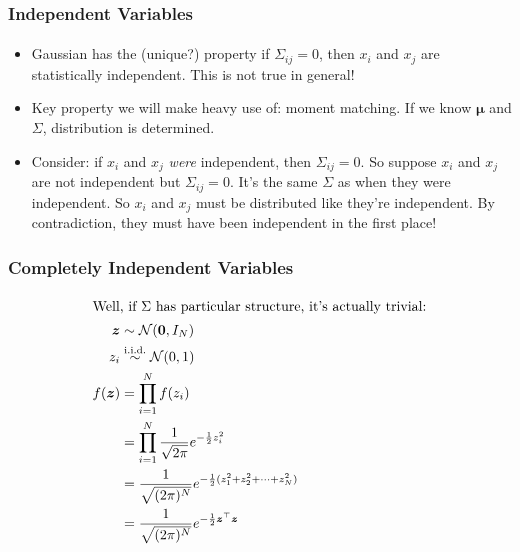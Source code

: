 \documentclass{beamer}                             %
\renewcommand{\vec}[1]{\bm{#1}}
\begin{document}
\begin{frame}
\frametitle{Independent Variables}
\framesubtitle{}
\begin{itemize}
  \item<+-> Gaussian has the (unique?) property if \(
    \Sigma_{ij} = 0 \), then \( x_i \) and \( x_j \) are
    statistically independent. This is not true in general!
  \item<+-> Key property we will make heavy use of: moment matching.
    If we know \( \vec{\mu} \) and \( \Sigma \), distribution is determined.
  \item<+-> Consider: if \( x_i \) and \( x_j \) \emph{were} independent,
    then \( \Sigma_{ij} = 0 \). So suppose \( x_i \) and \( x_j \) are not
    independent but \( \Sigma_{ij} = 0 \). It's the same \( \Sigma \) as when
    they were independent. So \( x_i \) and \( x_j \) must be distributed like
    they're independent. By contradiction, they must have been independent in
    the first place!
\end{itemize}
\end{frame}

\begin{frame}
\frametitle{Completely Independent Variables}
\framesubtitle{}
\begin{align*}
  \shortintertext{Well, if \( \Sigma \) has particular structure,
    it's actually trivial:}
  \vec{z} &\sim \mathcal{N}(\vec{0}, I_N) \\
  z_i &\overset{\text{i.i.d.}}{\sim} \mathcal{N}(0, 1) \\
  f(\vec{z})
  &= \prod_{i = 1}^N f(z_i) \\
  &= \prod_{i = 1}^N \frac{1}{\sqrt{2 \pi}} e^{-\frac{1}{2} z_i^2} \\
  &= \frac{1}{\sqrt{(2 \pi)^N}}
    e^{-\frac{1}{2} (z_1^2 + z_2^2 + \dotsb + z_N^2)} \\
  &= \frac{1}{\sqrt{(2 \pi)^N}} e^{-\frac{1}{2} \vec{z}^{\top} \vec{z}}
\end{align*}
\end{frame}
\end{document}
